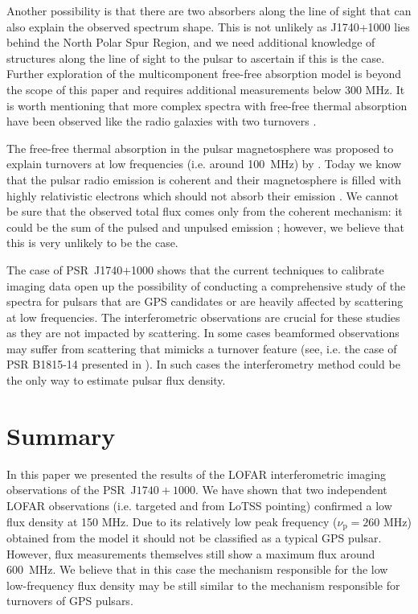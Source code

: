 \documentclass[manuscript]{aastex63}
\begin{document}
Another possibility is that there are two absorbers along the line of sight that can also explain the observed spectrum shape. This is not unlikely as J1740+1000 lies behind the North Polar Spur Region, and we need additional knowledge of structures along the line of sight to the  pulsar to ascertain if this is the case. Further exploration of the multicomponent free-free absorption model is beyond the scope of this paper and requires additional measurements below 300 MHz. It is worth mentioning that more complex spectra with free-free thermal absorption have been observed like the radio galaxies with two turnovers \citep[see, e.g.][and references therein]{2017Callingham}.

The free-free thermal absorption in the pulsar magnetosphere was proposed to explain turnovers at low frequencies (i.e. around 100~MHz) by \citet{1979Malov}. Today we know that the pulsar radio emission is coherent and their magnetosphere is filled with highly relativistic electrons which should not absorb their emission \citep{2017Mitra}. We cannot be sure that the observed total flux comes only from the coherent mechanism: it could be the sum of the pulsed and unpulsed emission \citep{2011Basu}; however, we believe that this is very unlikely to be the case.

The case of PSR~J1740$+$1000 shows that the current techniques to calibrate imaging data open up the possibility of conducting a comprehensive study of the spectra for pulsars that are GPS candidates or are heavily affected by scattering at low frequencies. The interferometric observations are crucial for these studies as they are not impacted by scattering.
In some cases beamformed observations may suffer from scattering that mimicks a turnover feature (see, i.e. the case of PSR B1815-14 presented in \citealt{2015Dembska}). In such cases the interferometry method could be the only way to estimate pulsar flux density. 

\section{Summary}

In this paper we presented the results of the LOFAR interferometric imaging observations of the PSR~J$1740+1000$. We have shown that two independent LOFAR observations (i.e. targeted and from LoTSS pointing) confirmed a low flux density at 150 MHz. Due to its relatively low peak frequency ($\nu_{\mathrm{p}} = 260$ MHz) obtained from the model it should not be classified as a typical GPS pulsar. However,  flux measurements themselves still show a maximum flux around 600~MHz. We believe that in this case the mechanism responsible for the low low-frequency flux density may be still similar to the mechanism responsible for turnovers of GPS pulsars.  
\end{document}
